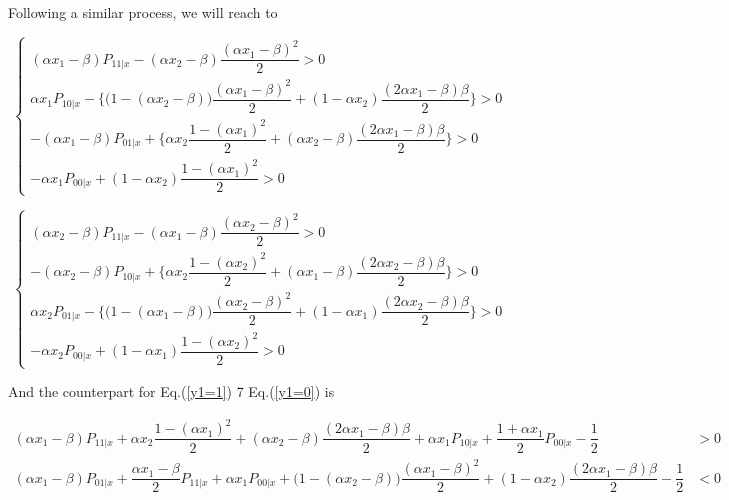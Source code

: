 \documentclass[a4paper]{article}
\begin{document}
Following a similar process, we will reach to 

$$\begin{cases}
(\alpha x_1 - \beta)P_{11|x} - (\alpha x_2 - \beta)\dfrac{ (\alpha x_1 - \beta)^2}{2} > 0\\
\alpha x_1 P_{10|x} - \{\big(1 - (\alpha x_2 - \beta)\big)\dfrac{(\alpha x_1 - \beta)^2}{2} + (1 - \alpha x_2)\dfrac{(2\alpha x_1 - \beta)\beta}{2}\} > 0\\
- (\alpha x_1- \beta)P_{01|x} + \{\alpha x_2\dfrac{1 - (\alpha x_1)^2}{2} + (\alpha x_2- \beta)\dfrac{(2\alpha x_1 - \beta)\beta}{2} \}  > 0\\
- \alpha x_1 P_{00|x} + (1 - \alpha x_2)\dfrac{1 - (\alpha x_1)^2}{2}> 0
\end{cases}$$


$$\begin{cases}
(\alpha x_2 - \beta)P_{11|x} - (\alpha x_1 - \beta)\dfrac{ (\alpha x_2 - \beta)^2}{2} > 0\\
- (\alpha x_2- \beta)P_{10|x} + \{\alpha x_2\dfrac{1 - (\alpha x_2)^2}{2} + (\alpha x_1- \beta)\dfrac{(2\alpha x_2 - \beta)\beta}{2} \} > 0\\
 \alpha x_2 P_{01|x} - \{\big(1 - (\alpha x_1 - \beta)\big)\dfrac{(\alpha x_2 - \beta)^2}{2} + (1 - \alpha x_1)\dfrac{(2\alpha x_2 - \beta)\beta}{2}\} > 0\\
- \alpha x_2 P_{00|x} + (1 - \alpha x_1)\dfrac{1 - (\alpha x_2)^2}{2} > 0
\end{cases}$$

And the counterpart for Eq.(\ref{y1=1}) 7 Eq.(\ref{y1=0}) is 


\begin{equation}
    \begin{array}{rl}
         (\alpha x_1 - \beta)P_{11|x} + \alpha x_2\dfrac{1 - (\alpha x_1)^2}{2} + (\alpha x_2 - \beta)\dfrac{(2\alpha x_1 - \beta)\beta}{2} + \alpha x_1 P_{10|x} + \dfrac{1 + \alpha x_1}{2}P_{00|x} - \dfrac{1}{2} & > 0  \\
         (\alpha x_1 - \beta)P_{01|x} + \dfrac{\alpha x_1 - \beta}{2}P_{11|x} + \alpha x_1 P_{00|x} + \big(1 - (\alpha x_2 - \beta)\big)\dfrac{(\alpha x_1 - \beta)^2}{2} + (1 - \alpha x_2)\dfrac{(2\alpha x_1 - \beta)\beta}{2} - \dfrac{1}{2} & < 0
    \end{array}
\end{equation}



\end{document}
